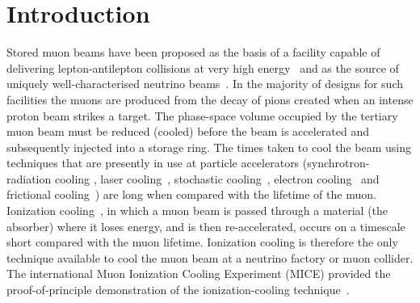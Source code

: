 \graphicspath{{01-Introduction/Figures/}}

\section{Introduction}
\label{Sect:Intro}

Stored muon beams have been proposed as the basis of a facility
capable of delivering lepton-antilepton collisions at very high
energy~\cite{Neuffer:1994bt,Palmer:2014nza} and as the source of
uniquely well-characterised neutrino 
beams~\cite{Geer:1998PhRvD..57.6989G,Bandyopadhyay:2007kx,Apollonio:2002en}.
In the majority of designs for such facilities the muons are produced
from the decay of pions created when an intense proton beam strikes a
target.
The phase-space volume occupied by the tertiary muon beam must be
reduced (cooled) before the beam is accelerated and subsequently injected
into a storage ring.
The times taken to cool the beam using techniques that are presently in
use at particle accelerators (synchrotron-radiation cooling
\cite{2012acph.book.....L}, laser
cooling~\cite{PhysRevLett.64.2901,PhysRevLett.67.1238,doi:10.1063/1.329218},
stochastic cooling~\cite{Marriner:2003mn}, electron
cooling~\cite{1063-7869-43-5-R01} and frictional cooling~\cite{PhysRevLett.125.164802})
are long when compared with the lifetime of the muon.
Ionization cooling~\cite{cooling_methods,Neuffer:1983jr}, in which a
muon beam is passed through a material (the absorber) where it
loses energy, and is then re-accelerated, occurs on a timescale short
compared with the muon lifetime.
Ionization cooling is therefore the only technique available to cool the muon beam at a neutrino factory or muon collider.
The international Muon Ionization Cooling Experiment (MICE)
provided the proof-of-principle demonstration of the
ionization-cooling technique~\cite{Bogomilov:2019kfj}.

